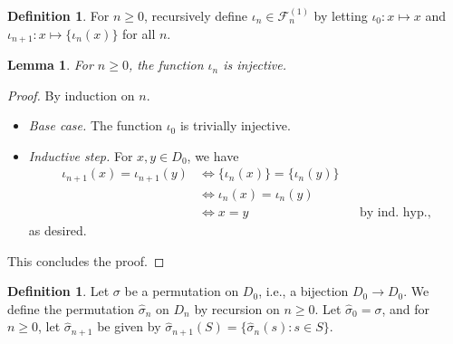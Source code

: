 \documentclass[a4paper,12pt]{article}
\newtheorem{lemma}[theorem]{Lemma}
\theoremstyle{definition}
\newtheorem{definition}[theorem]{Definition}
\theoremstyle{remark}
\newcommand{\fset}[2]{\mathcal F^{(#1)}_{#2}}
\begin{document}
\begin{definition}
    For $n \geq 0$, recursively define $\iota_n \in \fset 1n$ by letting $\iota_0 : x \mapsto x$ and $\iota_{n+1} : x \mapsto \{\iota_n(x)\}$ for all $n$.
\end{definition}

\begin{lemma}\label{lem:iota}
    For $n \geq 0$, the function $\iota_n$ is injective.
\end{lemma}
\begin{proof}
    By induction on $n$.
    \begin{itemize}
        \item \textit{Base case.} The function $\iota_0$ is trivially injective.
        \item \textit{Inductive step.} For $x, y \in D_0$, we have
        \begin{align*}
            \iota_{n+1}(x) = \iota_{n+1}(y) &\iff \{\iota_n(x)\} = \{\iota_n(y)\}\\
            &\iff \iota_n(x) = \iota_n(y)\\
            &\iff x = y &&\text{by ind.\ hyp.},
        \end{align*}
        as desired.
    \end{itemize}
    This concludes the proof.
\end{proof}

\begin{definition}
    Let $\sigma$ be a permutation on $D_0$, i.e., a bijection $D_0 \to D_0$. We define the permutation $\hat\sigma_n$ on $D_n$ by recursion on $n \geq 0$. Let $\hat\sigma_0 = \sigma$, and for $n \geq 0$, let $\hat\sigma_{n+1}$ be given by $\hat\sigma_{n+1}(S) = \{\hat\sigma_n(s) : s \in S\}$.
\end{definition}
\end{document}
